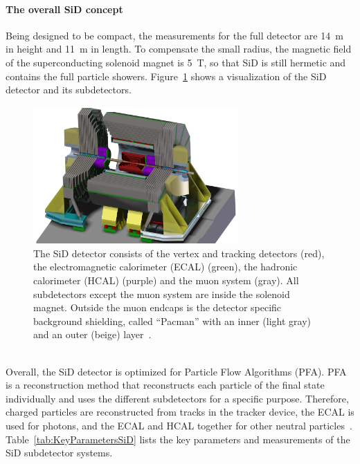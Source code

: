 \paragraph{The overall SiD concept}
Being designed to be compact, the measurements for the full detector are \SI{14}{m} in height and \SI{11}{m} in length.
To compensate the small radius, the magnetic field of the superconducting solenoid magnet is \SI{5}{T}, so that SiD is still hermetic and contains the full particle showers.
Figure~\ref{fig:SiD} shows a visualization of the SiD detector and its subdetectors.
\begin{figure}
\centering
\includegraphics[width=0.7\textwidth]{Figures/SiD_new.jpg}
\caption[Visualization of the SiD detector]{The SiD detector consists of the vertex and tracking detectors (red), the electromagnetic calorimeter (ECAL) (green), the hadronic calorimeter (HCAL) (purple) and the muon system (gray).
All subdetectors except the muon system are inside the solenoid magnet.
Outside the muon endcaps is the detector specific background shielding, called ``Pacman'' with an inner (light gray) and an outer (beige) layer~\cite{SiD_Geo}.}
\label{fig:SiD}
\end{figure}
\\
Overall, the SiD detector is optimized for Particle Flow Algorithms (PFA).
PFA is a reconstruction method that reconstructs each particle of the final state individually and uses the different subdetectors for a specific purpose.
Therefore, charged particles are reconstructed from tracks in the tracker device, the ECAL is used for photons, and the ECAL and HCAL together for other neutral particles~\cite{PFA}.
Table~\ref{tab:KeyParametersSiD} lists the key parameters and measurements of the SiD subdetector systems.\\
